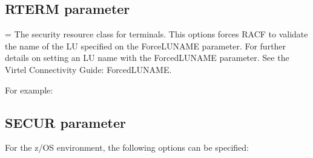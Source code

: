\documentclass[letterpaper,10pt,english]{sphinxmanual}
\begin{document}
\ignorespaces 

\subsection{RTERM parameter}
\label{\detokenize{Installation_Guide:rterm-parameter}}\label{\detokenize{Installation_Guide:index-112}}
\begin{sphinxVerbatim}[commandchars=\\\{\}]
\end{sphinxVerbatim}

\sphinxAtStartPar
{} = The security resource class for terminals. This options forces RACF to validate the name of the LU specified on the ForceLUNAME parameter. For further details on setting an LU name with the ForcedLUNAME parameter. See the Virtel Connectivity Guide: ForcedLUNAME.

\sphinxAtStartPar
For example:\sphinxhyphen{}

\begin{sphinxVerbatim}[commandchars=\\\{\}]
\end{sphinxVerbatim}

\ignorespaces 

\subsection{SECUR parameter}
\label{\detokenize{Installation_Guide:secur-parameter}}\label{\detokenize{Installation_Guide:index-113}}
\begin{sphinxVerbatim}[commandchars=\\\{\}]
 
\end{sphinxVerbatim}

\sphinxAtStartPar
For the z/OS environment, the following options can be specified:
\end{document}
